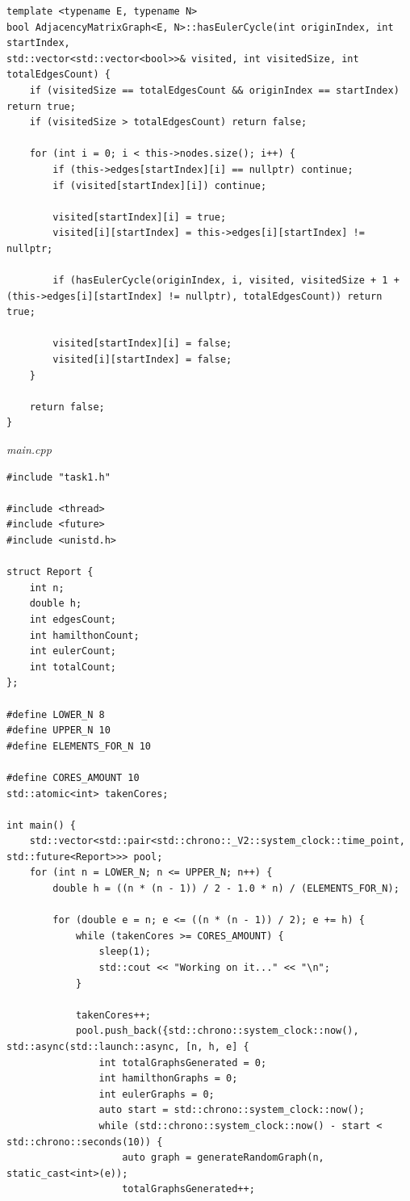 \documentclass[a4paper,14pt]{extarticle}
\begin{document}
\begin{enumerate}[1.]
\begin{verbatim}
template <typename E, typename N>
bool AdjacencyMatrixGraph<E, N>::hasEulerCycle(int originIndex, int startIndex, 
std::vector<std::vector<bool>>& visited, int visitedSize, int totalEdgesCount) {
    if (visitedSize == totalEdgesCount && originIndex == startIndex) return true;
    if (visitedSize > totalEdgesCount) return false;

    for (int i = 0; i < this->nodes.size(); i++) {
        if (this->edges[startIndex][i] == nullptr) continue;
        if (visited[startIndex][i]) continue;

        visited[startIndex][i] = true;
        visited[i][startIndex] = this->edges[i][startIndex] != nullptr;

        if (hasEulerCycle(originIndex, i, visited, visitedSize + 1 + (this->edges[i][startIndex] != nullptr), totalEdgesCount)) return true;

        visited[startIndex][i] = false;
        visited[i][startIndex] = false;
    }

    return false;
}
\end{verbatim}

          \textit{main.cpp}
          \begin{verbatim}
#include "task1.h"

#include <thread>
#include <future>
#include <unistd.h>

struct Report {
    int n;
    double h;
    int edgesCount;
    int hamilthonCount;
    int eulerCount;
    int totalCount;
};

#define LOWER_N 8
#define UPPER_N 10
#define ELEMENTS_FOR_N 10

#define CORES_AMOUNT 10
std::atomic<int> takenCores;

int main() {
    std::vector<std::pair<std::chrono::_V2::system_clock::time_point, std::future<Report>>> pool;
    for (int n = LOWER_N; n <= UPPER_N; n++) {
        double h = ((n * (n - 1)) / 2 - 1.0 * n) / (ELEMENTS_FOR_N);
        
        for (double e = n; e <= ((n * (n - 1)) / 2); e += h) {
            while (takenCores >= CORES_AMOUNT) {
                sleep(1);
                std::cout << "Working on it..." << "\n";
            }

            takenCores++;
            pool.push_back({std::chrono::system_clock::now(), std::async(std::launch::async, [n, h, e] {
                int totalGraphsGenerated = 0;
                int hamilthonGraphs = 0;
                int eulerGraphs = 0;
                auto start = std::chrono::system_clock::now();
                while (std::chrono::system_clock::now() - start < std::chrono::seconds(10)) {
                    auto graph = generateRandomGraph(n, static_cast<int>(e));
                    totalGraphsGenerated++;


\end{verbatim}
\end{enumerate}
\end{document}
